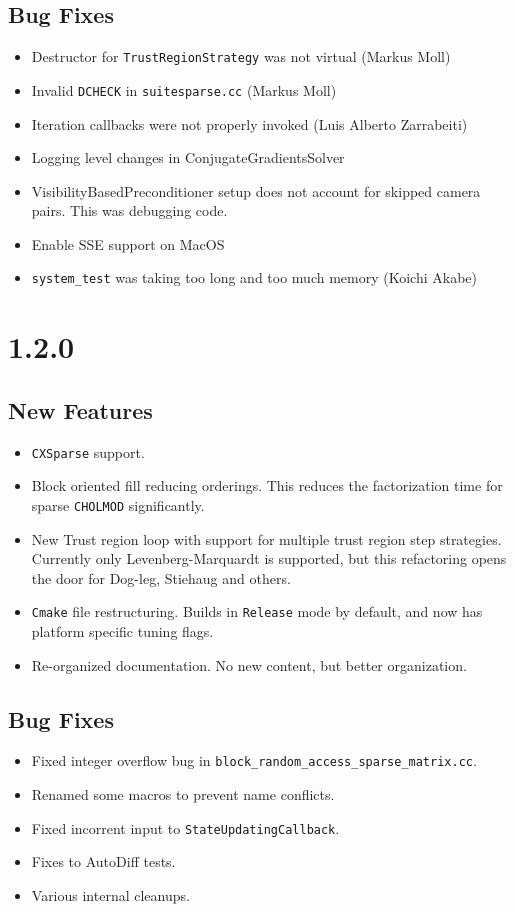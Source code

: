 \subsection{Bug Fixes}
\begin{itemize}
\item Destructor for \texttt{TrustRegionStrategy} was not virtual (Markus Moll)
\item Invalid \texttt{DCHECK} in \texttt{suitesparse.cc} (Markus Moll)
\item Iteration callbacks were not properly invoked (Luis Alberto Zarrabeiti)
\item Logging level changes in ConjugateGradientsSolver
\item VisibilityBasedPreconditioner setup does not account for skipped camera pairs. This was debugging code.
\item Enable SSE support on MacOS
\item \texttt{system\_test} was taking too long and too much memory (Koichi Akabe)
\end{itemize}
\section*{1.2.0}
\subsection{New Features}
\begin{itemize}
\item \texttt{CXSparse} support.
\item Block oriented fill reducing orderings. This
reduces the factorization time for sparse
\texttt{CHOLMOD} significantly.
\item New Trust region loop with support for multiple
trust region step strategies. Currently only Levenberg-Marquardt is supported, but this refactoring opens the door for Dog-leg, Stiehaug and others.
\item \texttt{Cmake} file restructuring.  Builds in \texttt{Release} mode by default, and now has platform specific tuning flags.
\item Re-organized documentation. No new content, but better organization.
\end{itemize}

\subsection{Bug Fixes}
\begin{itemize}
\item Fixed integer overflow bug in \texttt{block\_random\_access\_sparse\_matrix.cc}.
\item Renamed some macros to prevent name conflicts.
\item Fixed incorrent input to \texttt{StateUpdatingCallback}.
\item Fixes to AutoDiff tests.
\item Various internal cleanups.
\end{itemize}


